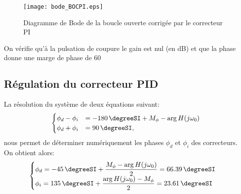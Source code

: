 \inputminted{scilab}{codes/scilab/code_q13_chap_correction.sce}
\begin{figure}
    \centering
    \texttt{[image: bode\_BOCPI.eps]}
    \caption{Diagramme de Bode de la boucle ouverte corrigée par 
    le correcteur PI}
\end{figure}
On vérifie qu'à la pulsation de coupure le gain est nul (en \si{\dB}) et
que la phase donne une marge de phase de \SI{60}{\degreeSI}
\subsection*{Régulation du correcteur PID}
La résolution du système de deux équations suivant:
\[
\begin{cases}
    \phi_d-\phi_i&=\SI{-180}{\degreeSI}+M_\phi-\arg{H(j\omega_0)} \\
    \phi_d+\phi_i&=\SI{90}{\degreeSI},
\end{cases}
\]
nous permet de déterminer numériquement les phases $\phi_d$ et 
$\phi_i$ des correcteurs. On obtient alors:
\[
\begin{cases}
    \phi_d=\SI{-45}{\degreeSI}+
           \dfrac{M_\phi-\arg{H(j\omega_0)}}{2}=\SI{66.39}{\degreeSI} \\
    \phi_i=\SI{135}{\degreeSI}+
           \dfrac{\arg{H(j\omega_0)}-M_\phi}{2}=\SI{23.61}{\degreeSI}
\end{cases}
\]


